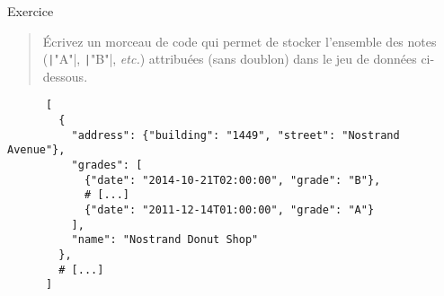 \documentclass[10pt]{beamer}
\begin{document}
 \begin{frame}[fragile]{Exercice}
  \begin{quote}
    Écrivez un morceau de code qui permet de stocker l'ensemble des notes (\texttt|"A"|, \texttt|"B"|, \emph{etc.}) attribuées (sans doublon) dans le jeu de données ci-dessous.
  \end{quote}

  \begin{beamercodeblock}
    \begin{verbatim}
      [
        {
          "address": {"building": "1449", "street": "Nostrand Avenue"},
          "grades": [
            {"date": "2014-10-21T02:00:00", "grade": "B"},
            # [...]
            {"date": "2011-12-14T01:00:00", "grade": "A"}
          ],
          "name": "Nostrand Donut Shop"
        },
        # [...]
      ]
    \end{verbatim}
  \end{beamercodeblock}
\end{frame}
\end{document}
